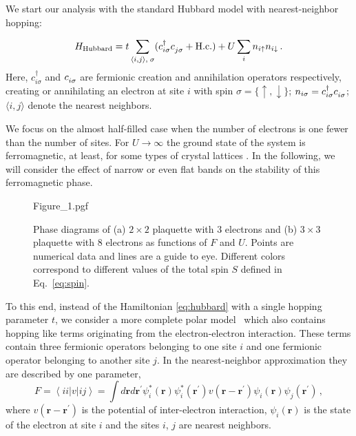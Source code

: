 
We start our analysis with the standard Hubbard model with nearest-neighbor hopping:

\begin{equation}\label{eq:hubbard}
    H_\text{Hubbard} = t \sum_{\substack{\langle i,j\rangle, \;\sigma}} (c^\dagger_{i\sigma} c^{\vphantom{\dagger}}_{j\sigma} + \text{H.c.})
      + U \sum_{i} n_{i\uparrow}n_{i\downarrow} \,.
\end{equation}
Here, $c^\dagger_{i\sigma}$ and $c^{\vphantom{\dagger}}_{i\sigma}$ are fermionic creation and annihilation operators respectively, creating or annihilating an electron at site $i$ with spin $\sigma = \{ \uparrow, \downarrow \}$; $n_{i\sigma} = c^\dagger_{i\sigma} c^{\vphantom{\dagger}}_{i\sigma}$; $\langle i, j \rangle$ denote the nearest neighbors.

We focus on the almost half-filled case when the number of electrons is one fewer than the number of sites. For $U\to \infty$ the ground state of the system is ferromagnetic, at least, for some types of crystal lattices \cite{nagaoka1966ferromagnetism}. In the following, we will consider the effect of narrow or even flat bands on the stability of this ferromagnetic phase. 

\begin{figure*}[t]
    \centering
    {Figure_1.pgf}
    \caption{Phase diagrams of (a) $2\times 2$ plaquette with 3 electrons and (b) $3\times 3$ plaquette with 8 electrons as functions of $F$ and $U$. Points are numerical data and lines are a guide to eye. Different colors correspond to different values of the total spin $S$ defined in Eq.~\eqref{eq:spin}.}
    \label{fig:ferromagnetism}
\end{figure*}

To this end, instead of the Hamiltonian \eqref{eq:hubbard} with a single hopping parameter $t$, we consider a more complete polar model~\cite{schubin1934electron,vonsovsky1979some1,vonsovsky1979some2} which also contains hopping like terms originating from the electron-electron interaction. These terms contain three fermionic operators belonging to one site $i$ and one fermionic operator belonging to another site $j$. In the nearest-neighbor approximation they are described by one parameter,
\begin{equation}\label{eq:coulomb}
    F \!= \left\langle ii\left| v\right| ij\right\rangle \!= \!\!\int d{\mathbf{r}}d{\mathbf{r}}%
^{\prime }\psi _{i}^{\ast }({\mathbf{r}})\psi _{i}^{\ast }({\mathbf{r}}^{\prime
})v\left( {\mathbf{r-r}}^{\prime }\right) \psi _{i}({\mathbf{r}})\psi _{j}({\mathbf{r}}%
^{\prime }) \,,
\end{equation}
where $v\left( {\mathbf{r-r}}^{\prime }\right)$ is the potential of inter-electron interaction, $\psi _{i}({\mathbf{r}})$ is the state of the electron at site $i$ and the sites $i$, $j$ are nearest neighbors. 

